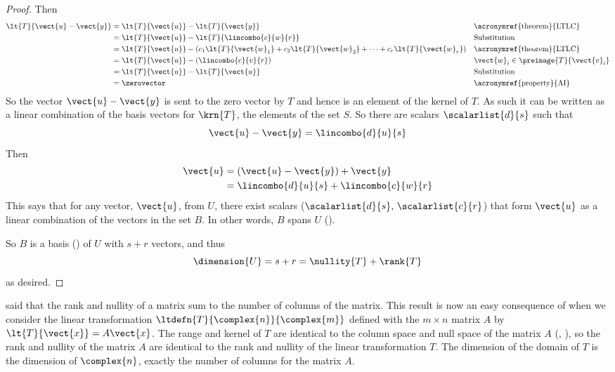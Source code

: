 \begin{proof}
%
Then
%
\begin{align*}
\lt{T}{\vect{u}-\vect{y}}&=\lt{T}{\vect{u}}-\lt{T}{\vect{y}}&&\text{\acronymref{theorem}{LTLC}}\\
%
&=\lt{T}{\vect{u}}-\lt{T}{\lincombo{c}{w}{r}}&&\text{Substitution}\\
%
&=\lt{T}{\vect{u}}-\left(c_1\lt{T}{\vect{w}_1}+c_2\lt{T}{\vect{w}_2}+\cdots+c_r\lt{T}{\vect{w}_r}\right)&&\text{\acronymref{theorem}{LTLC}}\\
%
&=\lt{T}{\vect{u}}-\left(\lincombo{c}{v}{r}\right)&&\vect{w}_i\in\preimage{T}{\vect{v}_i}\\
%
&=\lt{T}{\vect{u}}-\lt{T}{\vect{u}}&&\text{Substitution}\\
%
&=\zerovector&&\text{\acronymref{property}{AI}}
\end{align*}
%
So the vector $\vect{u}-\vect{y}$ is sent to the zero vector by $T$ and hence is an element of the kernel of $T$.  As such it can be written as a linear combination of the basis vectors for $\krn{T}$, the elements of the set $S$.  So there are scalars $\scalarlist{d}{s}$ such that
%
\begin{equation*}
\vect{u}-\vect{y}=\lincombo{d}{u}{s}
\end{equation*}
%
Then
%
\begin{align*}
\vect{u}&=\left(\vect{u}-\vect{y}\right)+\vect{y}\\
&=\lincombo{d}{u}{s}+\lincombo{c}{w}{r}
\end{align*}
%
This says that for any vector, $\vect{u}$, from $U$, there exist scalars ($\scalarlist{d}{s},\,\scalarlist{c}{r}$) that form $\vect{u}$ as a linear combination of the vectors in the set $B$.  In other words, $B$ spans $U$ ().\par
%
So $B$ is a basis () of $U$ with $s+r$ vectors, and thus
%
\begin{equation*}
\dimension{U}=s+r=\nullity{T}+\rank{T}
\end{equation*}
%
as desired.
%
\end{proof}
%
 said that the rank and nullity of a matrix sum to the number of columns of the matrix.  This result is now an easy consequence of  when we consider the linear transformation $\ltdefn{T}{\complex{n}}{\complex{m}}$ defined with the $m\times n$ matrix $A$ by $\lt{T}{\vect{x}}=A\vect{x}$.  The range and kernel of $T$ are identical to the column space and null space of the matrix $A$ (, ), so the rank and nullity of the matrix $A$ are identical to the rank and nullity of the linear transformation $T$.  The dimension of the domain of $T$ is the dimension of $\complex{n}$, exactly the number of columns for the matrix $A$.\par
